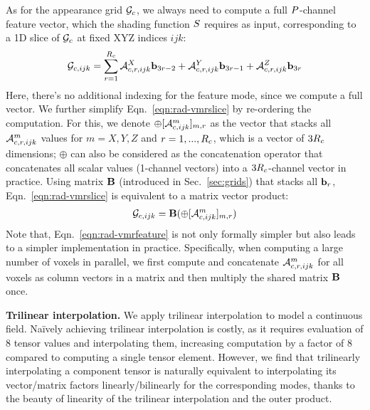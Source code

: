 \documentclass[runningheads]{llncs}
\newcommand{\boldstartspace}[1]{\vspace{0.1in}\noindent\textbf{#1}}
\begin{document}
As for the appearance grid $\mathcal{G}_{c}$, we always need to compute a full 
$P$-channel feature vector, which the shading function $S$ requires as input, corresponding to a 1D slice of $\mathcal{G}_{c}$ at fixed XYZ indices $ijk$:
\begin{align}
    \mathcal{G}_{c,ijk} =  \sum_{r=1}^{R_c} \mathcal{A}^X_{c,r,ijk} \mathbf{b}_{3r-2} + \mathcal{A}^Y_{c,r,ijk} \mathbf{b}_{3r-1}
     + \mathcal{A}^Z_{c,r,ijk} \mathbf{b}_{3r}
    \label{eqn:rad-vmrslice}
\end{align}
Here, there's no additional indexing for the feature mode, since we compute a full vector.
We further simplify Eqn.~\ref{eqn:rad-vmrslice} by re-ordering the computation.
For this, we denote $\oplus [\mathcal{A}^m_{c,ijk}]_{m,r}$ as the vector that stacks all $\mathcal{A}^m_{c,r,ijk}$ values for $m=X,Y,Z$ and $r=1,...,R_c$, which is a vector of $3R_c$ dimensions; $\oplus$ can also be considered as the concatenation operator that concatenates all scalar values (1-channel vectors) into a $3R_c$-channel vector in practice.
Using matrix $\mathbf{B}$ (introduced in Sec.~\ref{sec:grids}) that stacks all $\mathbf{b}_r$, Eqn.~\ref{eqn:rad-vmrslice} is equivalent to a matrix vector product:
\begin{align}
    \mathcal{G}_{c,ijk} =  \mathbf{B} (\oplus[\mathcal{A}^m_{c,ijk}]_{m,r})
    \label{eqn:rad-vmrfeature}
\end{align}
Note that, Eqn.~\ref{eqn:rad-vmrfeature} is not only formally simpler but also leads to a simpler implementation in practice.
Specifically, when computing a large number of voxels in parallel, we first compute and concatenate $\mathcal{A}^m_{c,r,ijk}$ for all voxels as column vectors in a matrix and then multiply the shared matrix $\mathbf{B}$ once. 







\boldstartspace{Trilinear interpolation.}
We apply trilinear interpolation to model a continuous field.
Na\"{i}vely achieving trilinear interpolation is costly, as it requires evaluation of 8 tensor values and interpolating them, increasing computation by a factor of 8 compared to computing a single tensor element.
However, we find that trilinearly interpolating a component tensor is naturally equivalent to interpolating its vector/matrix factors linearly/bilinearly for the corresponding modes, thanks to the beauty of linearity of the trilinear interpolation and the outer product.
\end{document}
